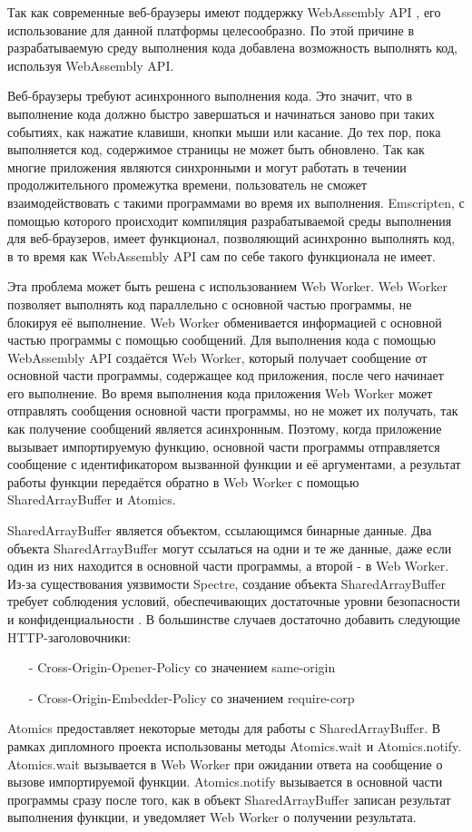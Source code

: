 Так как современные веб-браузеры имеют поддержку WebAssembly API \cite{WasmBrowserSupport}, его использование для данной платформы целесообразно.
По этой причине в разрабатываемую среду выполнения кода добавлена возможность выполнять код, используя WebAssembly API.

Веб-браузеры требуют асинхронного выполнения кода. 
Это значит, что в выполнение кода должно быстро завершаться и начинаться заново при таких событиях, как нажатие клавиши, кнопки мыши или касание.
До тех пор, пока выполняется код, содержимое страницы не может быть обновлено.
Так как многие приложения являются синхронными и могут работать в течении продолжительного промежутка времени, пользователь не сможет взаимодействовать с такими программами во время их выполнения.
Emscripten, с помощью которого происходит компиляция разрабатываемой среды выполнения для веб-браузеров, имеет функционал, позволяющий асинхронно выполнять код, в то время как WebAssembly API сам по себе такого функционала не имеет.

Эта проблема может быть решена с использованием Web Worker.
Web Worker позволяет выполнять код параллельно с основной частью программы, не блокируя её выполнение.
Web Worker обменивается информацией с основной частью программы с помощью сообщений. \cite{WebWorkerMessages}
Для выполнения кода с помощью WebAssembly API создаётся Web Worker, который получает сообщение от основной части программы, содержащее код приложения, после чего начинает его выполнение.
Во время выполнения кода приложения Web Worker может отправлять сообщения основной части программы, но не может их получать, так как получение сообщений является асинхронным.
Поэтому, когда приложение вызывает импортируемую функцию, основной части программы отправляется сообщение с идентификатором вызванной функции и её аргументами, а результат работы функции передаётся обратно в Web Worker с помощью SharedArrayBuffer и Atomics.

SharedArrayBuffer является объектом, ссылающимся бинарные данные.
Два объекта SharedArrayBuffer могут ссылаться на одни и те же данные, даже если один из них находится в основной части программы, а второй - в Web Worker.
Из-за существования уязвимости Spectre, создание объекта SharedArrayBuffer требует соблюдения условий, обеспечивающих достаточные уровни безопасности и конфиденциальности \cite{SharedArrayBuffer}. В большинстве случаев достаточно добавить следующие HTTP-заголовочники:
\begin{itemize}
    \item[-] Cross-Origin-Opener-Policy со значением same-origin 
    \item[-] Cross-Origin-Embedder-Policy со значением require-corp
\end{itemize}

Atomics предоставляет некоторые методы для работы с SharedArrayBuffer.
В рамках дипломного проекта использованы методы Atomics.wait и Atomics.notify.
Atomics.wait вызывается в Web Worker при ожидании ответа на сообщение о вызове импортируемой функции.
Atomics.notify вызывается в основной части программы сразу после того, как в объект SharedArrayBuffer записан результат выполнения функции, и уведомляет Web Worker о получении результата.

